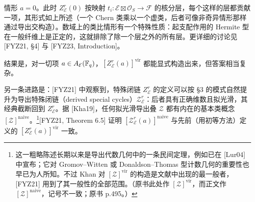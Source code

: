 
情形 $a=0$。此时 $Z^r_{\mathcal E}(0)$ 按映射 $t_i\colon\mathcal E\boxtimes\mathcal O_S\to\mathcal F$ 的核分层，每个这样的层都贡献一项，其形式如上所述（一个 Chern 类乘以一个虚类，后者可像非奇异情形那样通过导出交构造）。数域上的类比情形有一个特殊性质：起支配作用的 Hermite 型在一般纤维上是正定的，这就排除了除一个层之外的所有层。更详细的讨论见 [FYZ21, §4] 与 [FYZ23, Introduction]。

结果是，对一切项 $a\in A_{\mathcal E}(\mathbb{F}_q)$，$[Z^r_{\mathcal E}(a)]^{\mathrm{vir}}$ 都能显式构造出来，但答案相当复杂。

另一条进路是：[FYZ21] 中观察到，特殊闭链 $Z^r_{\mathcal E}$ 的定义可以按 §3 的模式自然提升为导出特殊闭链（derived special cycles）$\mathcal Z^r_{\mathcal E}$：后者具有正确维数且拟光滑，其经典截断回到 $Z^r_{\mathcal E}$。据 [Kha19]，任何拟光滑导出叠 $\mathcal Z$ 都有内在的基本类概念 $[\mathcal Z]^{\mathrm{naive}}$。\footnote{这一粗略陈述长期以来是导出代数几何中的一条民间定理，例如已在 [Lur04] 中宣布；它对 Gromov--Witten 或 Donaldson--Thomas 型计数几何的重要性也早已为人所知。不过 Khan 对 $[\mathcal Z]^{\mathrm{vir}}$ 的构造是文献中出现的最一般者，[FYZ21] 用到了其一般性的全部范围。（原书此处作 $[\mathcal Z]^{\mathrm{vir}}$，而正文作 $[\mathcal Z]^{\mathrm{naive}}$，记号不一致；原书 p.495。）}[FYZ21, Theorem 6.5] 证明 $[\mathcal Z^r_{\mathcal E}(a)]^{\mathrm{naive}}$ 与先前（用初等方法）定义的 $[Z^r_{\mathcal E}(a)]^{\mathrm{vir}}$ 一致。

